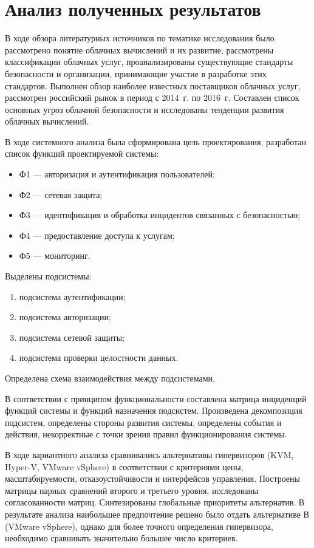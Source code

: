 \section{Анализ полученных результатов}

В ходе обзора литературных источников по тематике исследования было рассмотрено понятие облачных вычислений и их развитие, рассмотрены классификации облачных услуг, проанализированы существующие стандарты безопасности и организации, принимающие участие в разработке этих стандартов.
Выполнен обзор наиболее известных поставщиков облачных услуг, рассмотрен российский рынок в период с 2014~г. по 2016~г.
Составлен список основных угроз облачной безопасности и исследованы тенденции развития облачных вычислений.

В ходе системного анализа была сформирована цель проектирования, разработан список функций проектируемой системы:
\begin{itemize}
  \item Ф1 --- авторизация и аутентификация пользователей;
  \item Ф2 --- сетевая защита;
  \item Ф3 --- идентификация и обработка инцидентов связанных с безопасностью;
  \item Ф4 --- предоставление доступа к услугам;
  \item Ф5 --- мониторинг.
\end{itemize}

Выделены подсистемы:
\begin{enumerate}
  \item подсистема аутентификации;
  \item подсистема авторизации;
  \item подсистема сетевой защиты;
  \item подсистема проверки целостности данных.
\end{enumerate}

Определена схема взаимодействия между подсистемами.

В соответствии с принципом функциональности составлена матрица инциденций функций системы и функций назначения подсистем.
Произведена декомпозиция подсистем, определены стороны развития системы, определены события и действия, некорректные с точки зрения правил функционирования системы.

В ходе вариантного анализа сравнивались альтернативы гипервизоров (KVM, Hyper-V, VMware vSphere) в соответствии с критериями цены, масштабируемости, отказоустойчивости и интерфейсов управления.
Построены матрицы парных сравнений второго и третьего уровня, исследованы согласованности матриц.
Синтезированы глобальные приоритеты альтернатив.
В результате анализа наибольшее предпочтение решено было отдать альтернативе В (VMware vSphere), однако для более точного определения гипервизора, необходимо сравнивать значительно большее число критериев.

